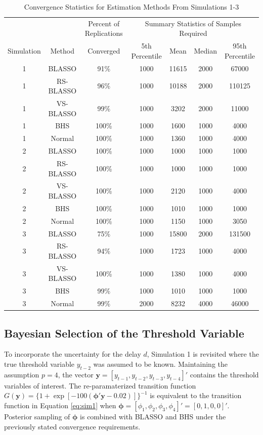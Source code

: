 \begin{table}[!h]
\scriptsize
  \centering
  \caption{Convergence Statistics for Estimation Methods From Simulations 1-3}
    \begin{tabular}{cc|c|cccc}
    \toprule
    & & Percent of Replications & \multicolumn{4}{c}{Summary Statistics of Samples Required}\\
    Simulation & Method & Converged  & 5th Percentile   & Mean & Median & 95th Percentile \\
    \midrule
    1    & BLASSO & 91\%   & 1000 & 11615 & 2000 & 67000 \\
    1    & RS-BLASSO & 96\%    & 1000 & 10188 & 2000 & 110125 \\
    1    & VS-BLASSO & 99\%    & 1000 & 3202 & 2000 & 11000 \\
    1    & BHS  & 100\%   & 1000 & 1600 & 1000 & 4000 \\
    1    & Normal & 100\%   & 1000 & 1360 & 1000 & 4000 \\
    \midrule
    2    & BLASSO & 100\%   & 1000 & 1000 & 1000 & 1000 \\
    2    & RS-BLASSO & 100\%   & 1000 & 1000 & 1000 & 1000 \\
    2    & VS-BLASSO & 100\%   & 1000 & 2120 & 1000 & 4000 \\
    2    & BHS  & 100\%   & 1000 & 1010 & 1000 & 1000 \\
    2    & Normal & 100\%   & 1000 & 1150 & 1000 & 3050 \\
    \midrule
    3    & BLASSO & 75\%    & 1000 & 15800 & 2000 & 131500 \\
    3    & RS-BLASSO & 94\%    & 1000 & 1723 & 1000 & 4000 \\
    3    & VS-BLASSO & 100\%   & 1000 & 1380 & 1000 & 4000 \\
    3    & BHS  & 99\%    & 1000 & 1010 & 1000 & 1000 \\
    3    & Normal & 99\%    & 2000 & 8232 & 4000 & 46000 \\
    \bottomrule
    \end{tabular}%
  \label{tab:convtable}%
\end{table}%

\vskip 3mm

\subsection{Bayesian Selection of the Threshold Variable}

To incorporate the uncertainty for the delay $d$, Simulation 1 is revisited where the true threshold variable $y_{t-2}$ was assumed to be known. Maintaining the assumption $p = 4$, the vector $\bm{y}=[y_{t-1},y_{t-2},y_{t-3},y_{t-4}]'$ contains the threshold variables of interest. The re-paramaterized transition function $G(\bm{y})=\{1+\exp[-100(\bm{\phi}'\bm{y}-0.02)]\}^{-1}$ is equivalent to the transition function in Equation \ref{eq:sim1} when $\bm{\phi}=[\phi_1,\phi_2,\phi_3,\phi_4]'=[0,1,0,0]'$. Posterior sampling of $\bm{\phi}$ is combined with BLASSO and BHS under the previously stated convergence requirements. 

